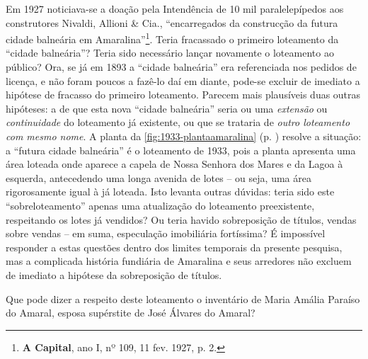 Em 1927 noticiava-se a doação pela Intendência de 10 mil paralelepípedos aos construtores Nivaldi, Allioni \& Cia., ``encarregados da construcção da futura cidade balneária em Amaralina''\footnote{\textbf{A Capital}, ano I, nº 109, 11 fev. 1927, p. 2.}. Teria fracassado o primeiro loteamento da ``cidade balneária''? Teria sido necessário lançar novamente o loteamento ao público? Ora, se já em 1893 a ``cidade balneária'' era referenciada nos pedidos de licença, e não foram poucos a fazê-lo daí em diante, pode-se excluir de imediato a hipótese de fracasso do primeiro loteamento. Parecem mais plausíveis duas outras hipóteses: a de que esta nova ``cidade balneária'' seria ou uma \textit{extensão} ou \textit{continuidade} do loteamento já existente, ou que se trataria de \textit{outro loteamento com mesmo nome}. A planta da \autoref{fig:1933-plantaamaralina} (p. \pageref{fig:1933-plantaamaralina}) resolve a situação: a ``futura cidade balneária'' é o loteamento de 1933, pois a planta apresenta uma área loteada onde aparece a capela de Nossa Senhora dos Mares e da Lagoa à esquerda, antecedendo uma longa avenida de lotes -- ou seja, uma área rigorosamente igual à já loteada. Isto levanta outras dúvidas: teria sido este ``sobreloteamento'' apenas uma atualização do loteamento preexistente, respeitando os lotes já vendidos? Ou teria havido sobreposição de títulos, vendas sobre vendas -- em suma, especulação imobiliária fortíssima? É impossível responder a estas questões dentro dos limites temporais da presente pesquisa, mas a complicada história fundiária de Amaralina e seus arredores não excluem de imediato a hipótese da sobreposição de títulos.


Que pode dizer a respeito deste loteamento o inventário de Maria Amália Paraíso do Amaral, esposa supérstite de José Álvares do Amaral? 

